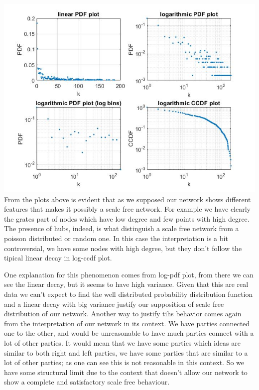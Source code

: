 \documentclass{article}%
\begin{document}
\includegraphics[scale=0.5]{Degree_distr}
\\

From the plots above is evident that as we supposed our network shows different features that makes it possibly a scale free network. For example we have clearly the grates part of nodes which have low degree and few points with high degree. The presence of hubs, indeed, is what distinguish a scale free network from a poisson distributed or random one. In this case the interpretation is a bit controversial, we have some nodes with high degree, but they don't follow the tipical linear decay in log-ccdf plot. 

One explanation for this phenomenon comes from log-pdf plot, from there we can see the linear decay, but it seems to have high variance. Given that this are real data we can't expect to find the well distributed probability distribution function and a linear decay with big variance justify our supposition of scale free distribution of our network.
Another way to justify tihs behavior comes again from the interpretation of our network in its context. We have parties connected one to the other, and would be unreasonable to have much parties connect with a lot of other parties. It would mean that we have some parties which ideas are similar to both right and left parties, we have some parties that are similar to a lot of other parties; as one can see this is not reasonable in this context. So we have some structural limit due to the context that doesn't allow our network to show a complete and satisfactory scale free behaviour.
\\
\end{document}
